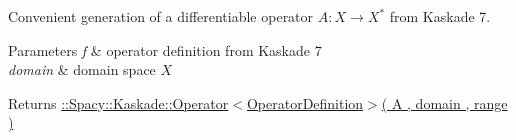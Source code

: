 Convenient generation of a differentiable operator $A: X\rightarrow X^*$ from Kaskade 7. 


\begin{DoxyParams}{Parameters}
{\em f} & operator definition from Kaskade 7 \\
\hline
{\em domain} & domain space $X$ \\
\hline
\end{DoxyParams}
\begin{DoxyReturn}{Returns}
\hyperlink{classSpacy_1_1Kaskade_1_1Operator}{\+:\+:Spacy\+:\+:Kaskade\+:\+:Operator$<$Operator\+Definition$>$( A , domain , range )} 
\end{DoxyReturn}
